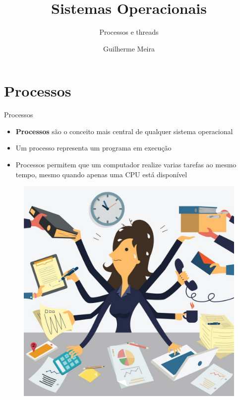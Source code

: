 \documentclass{beamer}
\title{Sistemas Operacionais} %
\subtitle{Processos e threads} %
\author{Guilherme Meira}
\begin{document}
  \frame{\maketitle}
  	
\section{Processos}
\begin{frame}{Processos}
   	\begin{itemize}
   		\item \textbf{Processos} são o conceito mais central de qualquer sistema operacional
   		\item Um processo representa um \alert{programa em execução}
   		\item Processos permitem que um computador realize varias tarefas ao mesmo tempo, mesmo quando apenas uma CPU está disponível
   	\end{itemize}
   	\begin{figure}
   		\includegraphics[width=0.3\paperwidth]{resources/multitask}
   	\end{figure}
\end{frame}
\end{document}
